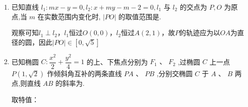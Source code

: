 \begin{enumerate}
\begin{jieda}
        易知该方程对于$x_1, x_2$应是轮换对称的，故可以将其整理成$x_1, x_2$为主元的式子，即$\left(-y - \dfrac{5}{2}k+kx\right)x_1  - (kx)x_2 + \left(\dfrac{1}{2}y+k+x_1x_2k\right) = 0$. 最后一项对于$x_1, x_2$是轮换对称的，因此必有前两项的系数相等，即$y + \dfrac{5}{2} - kx = kx$

        若$AB'$过定点$(x_0, y_0)$，则对任意的$x_1, x_2$，等式代入$(x_0, y_0)$均成立，则应有$y_0 + \dfrac{5}{2} - kx_0 = kx_0$恒成立，而$k$并非定值，因此$x_0 = \dfrac{5}{4}, y_0 = 0$可以使得等式恒成立，故若存在满足题干要求的顶点，则必为$\left(\dfrac{5}{4}, 0\right)$

        下证$A{B}^{\prime }$ 必定经过的定点$\left(\dfrac{5}{4}, 0\right)$：

        将$\left(\dfrac{5}{4}, 0\right)$代入$\left(-y - \dfrac{5}{2}k+kx\right)x_1  - (kx)x_2 + \left(\dfrac{1}{2}y+k+x_1x_2k\right) = 0$，可得$LHS = -\dfrac{5}{4}k(x_1+x_2)+k+x_1x_2 = k\left(1+x_1x_2-\dfrac{5}{4}(x_1+x_2)\right)$
        
        联立$\left\{\begin{array}{l}
             y = k(x-2) \\
             x^2 - \dfrac{y^2}{3} = 1
        \end{array}\right.$，消去$y$可得$3x^2-k^2(x-2)^2 = 3$，整理得$(3-k^2)x^2+4k^2x-(4k^2+3) = 0$，根据韦达定理有$\left\{\begin{array}{l}
             x_1+x_2 = \dfrac{4k^2}{k^2-3} \\
             x_1x_2 = \dfrac{4k^2+3}{k^2-3}
        \end{array}\right.$，代入可得$LHS = k\left(1+x_1x_2-\dfrac{5}{4}(x_1+x_2)\right) = 0 = RHS$
    \end{jieda}
    \item 已知直线 ${l}_{1} : {mx} - y = 0,{l}_{2} : x + {my} - m - 2 = 0,{l}_{1}$ 与 ${l}_{2}$ 的交点为 $P,O$ 为原点,当 $m$ 在实数范围内变化时, $\left| {PO}\right|$ 的取值范围是\blkda{$[0, \sqrt{5}]$}.
    \begin{jieda}
        观察可知$l_1 \perp l_2$，$l_1$恒过$O(0, 0)$，$l_2$恒过$A(2, 1)$，故$P$的轨迹应为以$OA$为直径的圆，因此$|PO| \in [0, \sqrt{5}]$
    \end{jieda}
    \item 已知椭圆 $C : \dfrac{{x}^{2}}{2} + \dfrac{{y}^{2}}{4} = 1$ 的上、下焦点分别为 ${F}_{1}\text{ 、 }{F}_{2}$ ,过椭圆 $C$ 上一点 $P\left( {1,\sqrt{2}}\right)$ 作倾斜角互补的两条直线 ${PA}$ 、 ${PB}$ ,分别交椭圆 $C$ 于 $A$ 、 $B$ 两点,则直线 ${AB}$ 的斜率为.
    \begin{jieda}
        取特值：
        

\end{jieda}
\end{enumerate}
